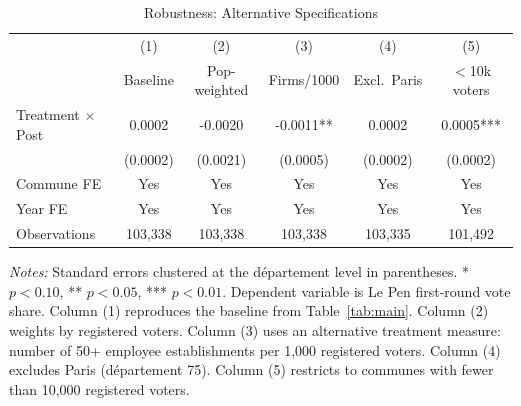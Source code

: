 \begin{table}[H]
\centering
\caption{Robustness: Alternative Specifications}
\label{tab:robust}
\begin{threeparttable}
\begin{tabular}{l *{5}{c}}
\toprule
& (1) & (2) & (3) & (4) & (5) \\
& Baseline & Pop-weighted & Firms/1000 & Excl.\ Paris & $<$10k voters \\
\midrule
Treatment $\times$ Post & 0.0002 & -0.0020 & -0.0011** & 0.0002 & 0.0005*** \\
& (0.0002) & (0.0021) & (0.0005) & (0.0002) & (0.0002) \\[0.5em]
\midrule
Commune FE & Yes & Yes & Yes & Yes & Yes \\
Year FE & Yes & Yes & Yes & Yes & Yes \\
Observations & 103,338 & 103,338 & 103,338 & 103,335 & 101,492 \\
\bottomrule
\end{tabular}
\begin{tablenotes}[flushleft]
\small
\item \textit{Notes:} Standard errors clustered at the d\'epartement level in parentheses. * $p<0.10$, ** $p<0.05$, *** $p<0.01$. Dependent variable is Le Pen first-round vote share. Column (1) reproduces the baseline from Table~\ref{tab:main}. Column (2) weights by registered voters. Column (3) uses an alternative treatment measure: number of 50+ employee establishments per 1,000 registered voters. Column (4) excludes Paris (d\'epartement 75). Column (5) restricts to communes with fewer than 10,000 registered voters.
\end{tablenotes}
\end{threeparttable}
\end{table}
